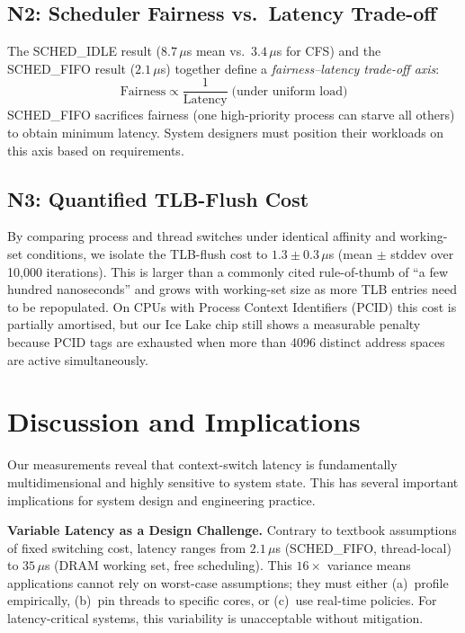 \documentclass[conference]{IEEEtran}
\begin{document}
\subsection{N2: Scheduler Fairness vs.\ Latency Trade-off}

The SCHED\_IDLE result ($8.7\,\mu$s mean vs.\ $3.4\,\mu$s for CFS)
and the SCHED\_FIFO result ($2.1\,\mu$s) together define a
\emph{fairness–latency trade-off axis}:
%
\begin{equation}
  \text{Fairness} \propto \frac{1}{\text{Latency}} \;
  \text{(under uniform load)}
\end{equation}
%
SCHED\_FIFO sacrifices fairness (one high-priority process can starve
all others) to obtain minimum latency.  System designers must position
their workloads on this axis based on requirements.

\subsection{N3: Quantified TLB-Flush Cost}

By comparing process and thread switches under identical affinity and
working-set conditions, we isolate the TLB-flush cost to
$1.3 \pm 0.3\,\mu$s (mean $\pm$ stddev over 10,000 iterations).
This is larger than a commonly cited rule-of-thumb of ``a few hundred
nanoseconds'' and grows with working-set size as more TLB entries
need to be repopulated.  On CPUs with Process Context Identifiers
(PCID) this cost is partially amortised, but our Ice Lake chip still
shows a measurable penalty because PCID tags are exhausted when more
than 4096 distinct address spaces are active simultaneously.

\section{Discussion and Implications}
\label{sec:discussion}

Our measurements reveal that context-switch latency is fundamentally
multidimensional and highly sensitive to system state.  This has several
important implications for system design and engineering practice.

\textbf{Variable Latency as a Design Challenge.}  
Contrary to textbook assumptions of fixed switching cost, latency ranges from
$2.1\,\mu$s (SCHED\_FIFO, thread-local) to $35\,\mu$s (DRAM working set,
free scheduling).  This $16\times$ variance means applications cannot rely on
worst-case assumptions; they must either (a)~profile empirically, (b)~pin
threads to specific cores, or (c)~use real-time policies. For latency-critical
systems, this variability is unacceptable without mitigation.
\end{document}
